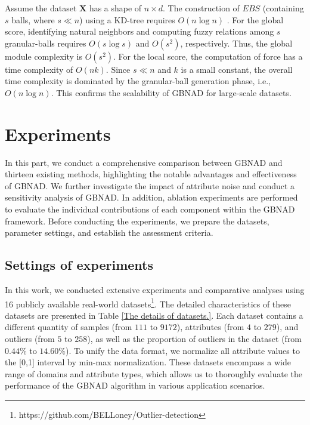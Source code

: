 \documentclass[times, review, 10pt]{elsarticle}
\begin{document}
Assume the dataset $\boldsymbol{X}$ has a shape of $n \times d$. The construction of $EBS$ (containing $s$ balls, where $s \ll n$) using a KD-tree requires $O(n \log n)$ \cite{xie2023efficient}.
For the global score, identifying natural neighbors and computing fuzzy relations among $s$ granular-balls requires $O(s \log s)$ and $O(s^2)$, respectively. Thus, the global module complexity is $O(s^2)$.
For the local score, the computation of force has a time complexity of $O(nk)$.
Since $s \ll n$ and $k$ is a small constant, the overall time complexity is dominated by the granular-ball generation phase, i.e., $O(n \log n)$. This confirms the scalability of GBNAD for large-scale datasets.

\section{Experiments}
\label{Experiments}
In this part, we conduct a comprehensive comparison between GBNAD and thirteen existing methods, highlighting the notable advantages and effectiveness of GBNAD. We further investigate the impact of attribute noise and conduct a sensitivity analysis of GBNAD. In addition, ablation experiments are performed to evaluate the individual contributions of each component within the GBNAD framework. Before conducting the experiments, we prepare the datasets, parameter settings, and establish the assessment criteria.
\subsection{Settings of experiments}
In this work, we conducted extensive experiments and comparative analyses using 16 publicly available real-world datasets\footnote{https://github.com/BELLoney/Outlier-detection}. The detailed characteristics of these datasets are presented in Table \ref{The details of datasets.}. Each dataset contains a different quantity of samples (from $111$ to $9172$), attributes (from $4$ to $279$), and outliers (from $5$ to $258$), as well as the proportion of outliers in the dataset (from $0.44\%$ to $14.60\%$). To unify the data format, we normalize all attribute values to the [0,1] interval by min-max normalization. These datasets encompass a wide range of domains and attribute types, which allows us to thoroughly evaluate the performance of the GBNAD algorithm in various application scenarios.
\end{document}
